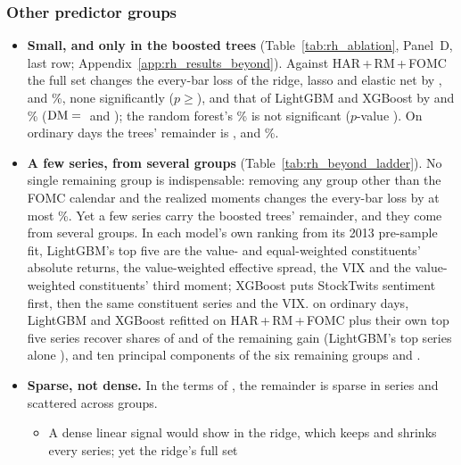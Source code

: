 \subsubsection{Other predictor groups}
\label{sec:rh_fi_rest}
\label{sec:rh_results_beyond}
\begin{itemize}
\item \textbf{Small, and only in the boosted trees} (Table~\ref{tab:rh_ablation}, Panel~D, last row;
  Appendix~\ref{app:rh_results_beyond}). Against HAR\,+\,RM\,+\,FOMC the full set changes the every-bar loss of the
  ridge, lasso and elastic net by \rhabRidgeFullVsAddRmFomcAllPct, \rhabLassoFullVsAddRmFomcAllPct{} and
  \rhabEnetFullVsAddRmFomcAllPct\%, none significantly ($p \geq{}$\rhabLinFullVsAddRmFomcAllPMin), and that of
  LightGBM and XGBoost by \rhabLgbmFullVsAddRmFomcAllPct{} and \rhabXgbFullVsAddRmFomcAllPct\%
  ($\mathrm{DM}={}$\rhabLgbmFullVsAddRmFomcAllDm{} and \rhabXgbFullVsAddRmFomcAllDm); the random forest's
  \rhabRfFullVsAddRmFomcAllPct\% is not significant ($p$-value \rhabRfFullVsAddRmFomcAllP). On ordinary days the trees'
  remainder is \rhabLgbmFullVsAddRmFomcOrdPct, \rhabXgbFullVsAddRmFomcOrdPct{} and \rhabRfFullVsAddRmFomcOrdPct\%.
\item \textbf{A few series, from several groups} (Table~\ref{tab:rh_beyond_ladder}). No single remaining group is
  indispensable: removing any group other than the FOMC calendar and the realized moments changes the every-bar loss
  by at most \rhabLoOtherAllMaxAbs\%. Yet a few series carry the boosted trees' remainder, and they come from several
  groups. In each model's own ranking from its 2013 pre-sample fit, LightGBM's top five are the value- and
  equal-weighted constituents' absolute returns, the value-weighted effective spread, the VIX and the value-weighted
  constituents' third moment; XGBoost puts StockTwits sentiment first, then the same constituent series and the VIX.
  on ordinary days, LightGBM and XGBoost refitted on HAR\,+\,RM\,+\,FOMC plus their own top five series recover
  shares of \rhbyLLgbmKFiveOrdR{} and \rhbyLXgbKFiveOrdR{} of the remaining gain (LightGBM's top series alone
  \rhbyLLgbmKOneOrdR), and ten principal components of the six remaining groups \rhbyFLgbmPcaTenOrdR{} and
  \rhbyFXgbPcaTenOrdR.
\item \textbf{Sparse, not dense.} In the terms of \citet{GiannoneLenzaPrimiceri2021}, the remainder is sparse in
  series and scattered across groups.
  \begin{itemize}
  \item A dense linear signal would show in the ridge, which keeps and shrinks every series; yet the ridge's full set

\end{itemize}
\end{itemize}
